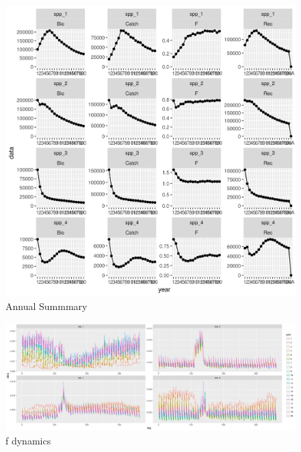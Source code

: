 \documentclass[review]{elsarticle}
\begin{document}
\begin{figure}[!ht]
	\includegraphics[width = \linewidth]{../tests/plots/annual_summary}
		\caption{Annual Summmary}
\end{figure}	

\begin{figure}[!ht]
	\includegraphics[width = \linewidth]{../tests/plots/fDynamics}
		\caption{f dynamics}
\end{figure}	
\end{document}
